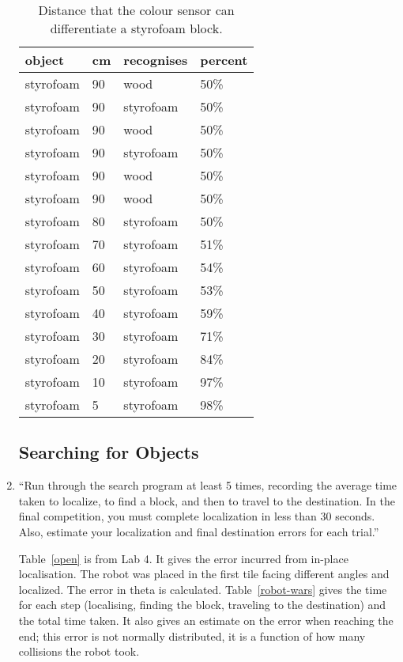 \documentclass[twocolumn]{article}
\begin{document}
\begin{enumerate}
\begin{table*}[htb]\footnotesize
\begin{center}\begin{tabular}{llll}
object& cm& recognises& percent \\
\hline
styrofoam& 90& wood& 50\% \\
styrofoam& 90& styrofoam& 50\% \\
styrofoam& 90& wood& 50\% \\
styrofoam& 90& styrofoam& 50\% \\
styrofoam& 90& wood& 50\% \\
styrofoam& 90& wood& 50\% \\
styrofoam& 80& styrofoam& 50\% \\
styrofoam& 70& styrofoam& 51\% \\
styrofoam& 60& styrofoam& 54\% \\
styrofoam& 50& styrofoam& 53\% \\
styrofoam& 40& styrofoam& 59\% \\
styrofoam& 30& styrofoam& 71\% \\
styrofoam& 20& styrofoam& 84\% \\
styrofoam& 10& styrofoam& 97\% \\
styrofoam&  5& styrofoam& 98\% \\
\end{tabular}\end{center}
\caption{Distance that the colour sensor can differentiate a styrofoam block.}
\label{qstyrofoam}
\end{table*}

\subsection{Searching for Objects}

\item
``Run through the search program at least 5 times, recording the average time taken to localize, to find a block, and then to travel to the destination. In the final competition, you must complete localization in less than 30 seconds. Also, estimate your localization and final destination errors for each trial.\cite{lab5}''

Table~\ref{open} is from Lab 4\cite{alexneil4}. It gives the error incurred from in-place localisation. The robot was placed in the first tile facing different angles and localized. The error in theta is calculated. Table~\ref{robot-wars} gives the time for each step (localising, finding the block, traveling to the destination) and the total time taken. It also gives an estimate on the error when reaching the end; this error is not normally distributed, it is a function of how many collisions the robot took.


\end{enumerate}
\end{document}
